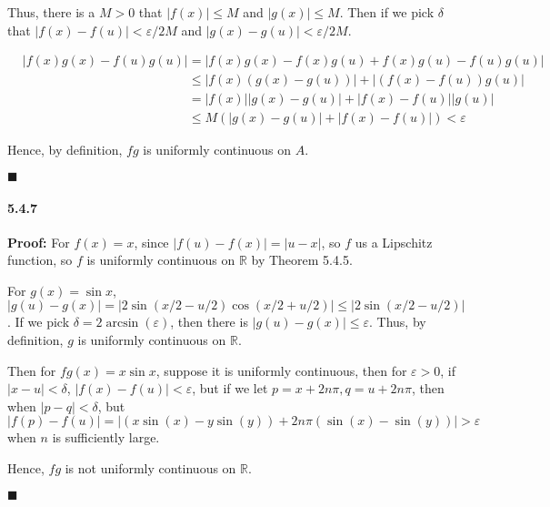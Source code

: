 \documentclass[11pt]{article}
\newcommand{\qed}{
	\begin{flushright}
		$\blacksquare$
	\end{flushright}}
\begin{document}
		Thus, there is a $M > 0$ that $|f(x)| \leq M$ and $|g(x)| \leq M$. Then if we pick $\delta$ that $|f(x) - f(u)| < \varepsilon/2M$ and $|g(x) - g(u)| < \varepsilon/2M$.
		
		\begin{align}
			&|f(x)g(x) - f(u)g(u)| = |f(x)g(x) - f(x)g(u) + f(x)g(u) - f(u)g(u)|\nonumber\\
			&\phantom{|f(x)g(x) - f(u)g(u)|} \leq |f(x)(g(x) - g(u))| + |(f(x) - f(u))g(u)|\nonumber\\
			&\phantom{|f(x)g(x) - f(u)g(u)|} = |f(x)||g(x) - g(u)| + |f(x) - f(u)||g(u)|\nonumber\\
			&\phantom{|f(x)g(x) - f(u)g(u)|} \leq M(|g(x) - g(u)| + |f(x) - f(u)|) < \varepsilon\nonumber
		\end{align}
		
		Hence, by definition, $fg$ is uniformly continuous on $A$.
		\qed
	\paragraph{5.4.7}\textbf{Proof:}
		For $f(x) = x$, since $|f(u) - f(x)| = |u - x|$, so $f$ us a Lipschitz function, so $f$ is uniformly continuous on $\mathbb{R}$ by Theorem 5.4.5.
		
		For $g(x) = \sin x$, $|g(u) - g(x)| = |2\sin(x/2 - u/2)\cos(x/2 + u/2)| \leq |2\sin(x/2 - u/2)|$. If we pick $\delta = 2\arcsin(\varepsilon)$, then there is $|g(u) - g(x)| \leq \varepsilon$. Thus, by definition, $g$ is uniformly continuous on $\mathbb{R}$.
		
		Then for $fg(x) = x\sin x$, suppose it is uniformly continuous, then for $\varepsilon > 0$, if $|x - u| < \delta$, $|f(x) - f(u)| < \varepsilon$, but if we let $p = x + 2n\pi, q = u + 2n\pi$, then when $|p - q| < \delta$, but $|f(p) - f(u)| = |(x\sin(x)-y\sin(y))+2n\pi(\sin(x)-\sin(y))|>\varepsilon$ when $n$ is sufficiently large.
		
		Hence, $fg$ is not uniformly continuous on $\mathbb{R}$.
		\qed
\end{document}
